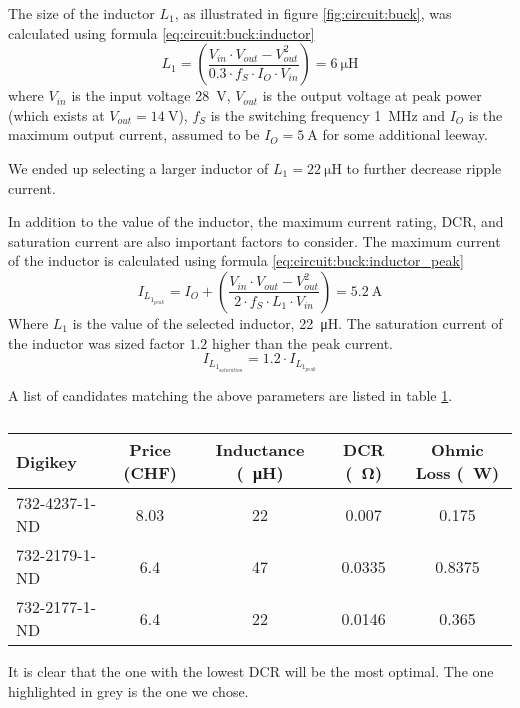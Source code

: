 The size of the inductor $L_1$, as illustrated in figure \ref{fig:circuit:buck},
was calculated using formula \ref{eq:circuit:buck:inductor}
\begin{equation}
    L_1 = \left( \frac{V_{in} \cdot V_{out} - V_{out}^2}{0.3 \cdot f_S \cdot I_O \cdot V_{in}} \right) = \SI{6}{\micro\henry}
    \label{eq:circuit:buck:inductor}
\end{equation}
where $V_{in}$ is the  input  voltage  \SI{28}{\volt},  $V_{out}$  is the output
voltage at peak power (which exists at $V_{out} = \SI{14}{\volt}$), $f_S$ is the
switching frequency \SI{1}{\mega\hertz} and $I_O$ is the maximum output current,
assumed   to   be   $I_O  =  \SI{5}{\ampere}$  for   some   additional   leeway.

We ended up selecting a  larger  inductor  of  $L_1  = \SI{22}{\micro\henry}$ to
further decrease ripple current.

In addition to the value of  the  inductor, the maximum current rating, DCR, and
saturation  current are also important factors to consider. The maximum  current
of the inductor is calculated using formula 
\ref{eq:circuit:buck:inductor_peak}
\begin{equation}
    I_{L_{1_{peak}}} = I_O + \left( \frac{V_{in} \cdot V_{out} - V_{out}^2}{2 \cdot f_S \cdot L_1 \cdot V_{in}} \right) = \SI{5.2}{\ampere}
    \label{eq:circuit:buck:inductor_peak}
\end{equation}
Where $L_1$  is  the  value  of  the selected inductor, \SI{22}{\micro\henry}. The
saturation  current  of the inductor was sized factor $1.2$ higher than the peak
current.
\begin{equation}
    I_{L_{1_{saturation}}} = 1.2 \cdot I_{L_{1_{peak}}}
    \label{eq:circuit:buck:inductor_saturation}
\end{equation}

A  list  of  candidates  matching  the  above  parameters  are  listed in  table
\ref{tab:circuit:buck:inductor}.

\begin{table}[th!]
    \begin{center}
        \caption{}
        \label{tab:circuit:buck:inductor}
        \begin{tabular}{lcccc}
            \toprule
            Digikey         & Price (CHF) & Inductance (\SI{}{\micro\henry}) & DCR (\SI{}{\ohm}) & Ohmic Loss (\SI{}{\watt}) \\
            \midrule
            \rowcolor{lightgray}
            732-4237-1-ND   & 8.03        & 22                               & 0.007             & 0.175  \\
            732-2179-1-ND   & 6.4         & 47                               & 0.0335            & 0.8375 \\
            732-2177-1-ND   & 6.4         & 22                               & 0.0146            & 0.365  \\
            \bottomrule
        \end{tabular}
    \end{center}
\end{table}

It  is  clear that the one with the lowest DCR will be the most optimal. The one
highlighted in grey is the one we chose.

